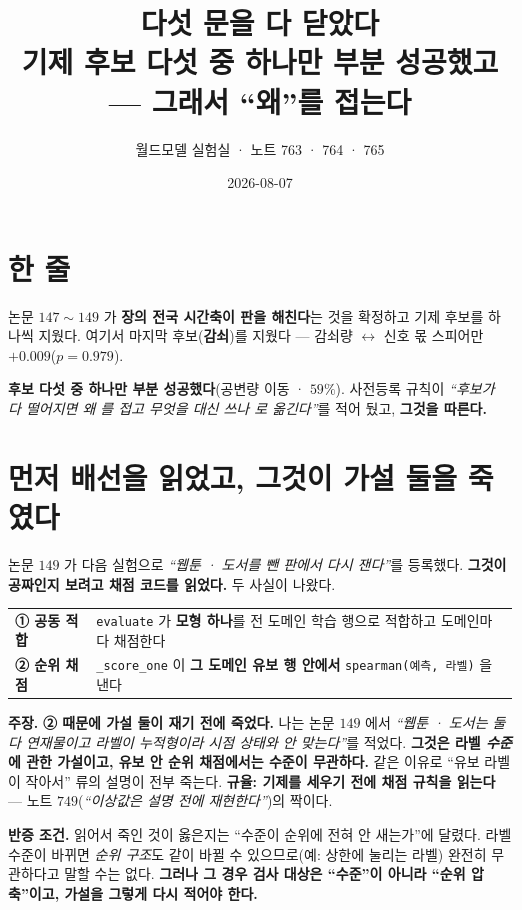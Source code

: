 \documentclass[10pt,a4paper]{article}
\title{\bfseries 다섯 문을 다 닫았다\\[2pt]
\large 기제 후보 다섯 중 하나만 부분 성공했고 --- 그래서 ``왜''를 접는다}
\author{월드모델 실험실 · 노트 763 · 764 · 765}
\date{2026-08-07}
\newcommand{\claim}[2]{\begin{claimbox}\textbf{주장.} #1\par\smallskip
  \textcolor{gray!70}{\textbf{반증 조건.} #2}\end{claimbox}}
\begin{document}
\maketitle

\section{한 줄}

논문 $147 \sim 149$ 가 \textbf{장의 전국 시간축이 판을 해친다}는 것을 확정하고 기제
후보를 하나씩 지웠다. 여기서 마지막 후보(\textbf{감쇠})를 지웠다 --- 감쇠량
$\leftrightarrow$ 신호 몫 스피어만 $\mathbf{+0.009}$($p{=}0.979$).

\textbf{후보 다섯 중 하나만 부분 성공했다}(공변량 이동 · $59\%$). 사전등록 규칙이
\emph{``후보가 다 떨어지면 왜 를 접고 무엇을 대신 쓰나 로 옮긴다''}를 적어 뒀고,
\textbf{그것을 따른다.}

\section{먼저 배선을 읽었고, 그것이 가설 둘을 죽였다}

논문 $149$ 가 다음 실험으로 \emph{``웹툰 · 도서를 뺀 판에서 다시 잰다''}를 등록했다.
\textbf{그것이 공짜인지 보려고 채점 코드를 읽었다.} 두 사실이 나왔다.

\begin{center}
\begin{tabular}{ll}
\toprule
\textbf{① 공동 적합} & \texttt{evaluate} 가 \textbf{모형 하나}를 전 도메인 학습 행으로
적합하고 도메인마다 채점한다 \\
\textbf{② 순위 채점} & \texttt{\_score\_one} 이 \textbf{그 도메인 유보 행 안에서}
\texttt{spearman(예측, 라벨)} 을 낸다 \\
\bottomrule
\end{tabular}
\end{center}

\claim{\textbf{② 때문에 가설 둘이 재기 전에 죽었다.} 나는 논문 $149$ 에서 \emph{``웹툰 ·
도서는 둘 다 연재물이고 라벨이 누적형이라 시점 상태와 안 맞는다''}를 적었다.
\textbf{그것은 라벨 \emph{수준}에 관한 가설이고, 유보 안 순위 채점에서는 수준이 무관하다.}
같은 이유로 ``유보 라벨이 작아서'' 류의 설명이 전부 죽는다. \textbf{규율: 기제를
세우기 전에 채점 규칙을 읽는다} --- 노트 $749$(\emph{``이상값은 설명 전에
재현한다''})의 짝이다.}
{읽어서 죽인 것이 옳은지는 ``수준이 순위에 전혀 안 새는가''에 달렸다. 라벨 수준이
바뀌면 \emph{순위 구조}도 같이 바뀔 수 있으므로(예: 상한에 눌리는 라벨) 완전히 무관하다고
말할 수는 없다. \textbf{그러나 그 경우 검사 대상은 ``수준''이 아니라 ``순위 압축''이고,
가설을 그렇게 다시 적어야 한다.}}
\end{document}
